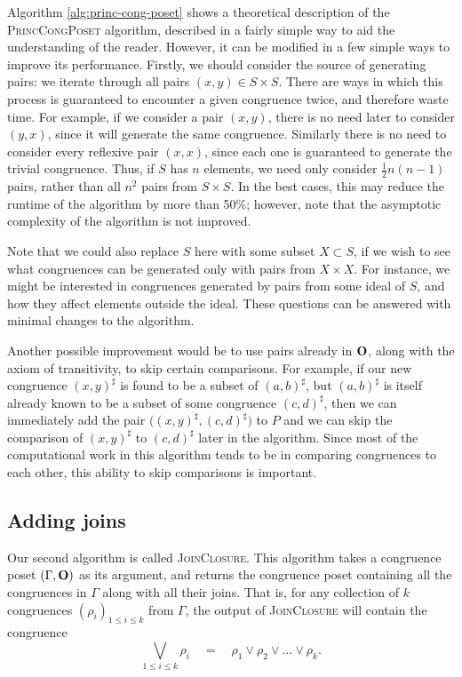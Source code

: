 Algorithm \ref{alg:princ-cong-poset} shows a theoretical description of the
\textsc{PrincCongPoset} algorithm, described in a fairly simple way to aid the
understanding of the reader.  However, it can be modified in a few simple ways
to improve its performance.  Firstly, we should consider the source of
generating pairs: we iterate through all pairs $(x,y) \in S \times S$.  There
are ways in which this process is guaranteed to encounter a given congruence
twice, and therefore waste time.  For example, if we consider a pair $(x,y)$,
there is no need later to consider $(y,x)$, since it will generate the same
congruence.  Similarly there is no need to consider every reflexive pair
$(x,x)$, since each one is guaranteed to generate the trivial congruence.  Thus,
if $S$ has $n$ elements, we need only consider $\frac{1}{2}n(n-1)$ pairs, rather
than all $n^2$ pairs from $S \times S$.  In the best cases, this may reduce the
runtime of the algorithm by more than 50\%; however, note that the asymptotic
complexity of the algorithm is not improved.

Note that we could also replace $S$ here with some subset $X \subset S$, if we
wish to see what congruences can be generated only with pairs from $X \times X$.
For instance, we might be interested in congruences generated by pairs from some
ideal of $S$, and how they affect elements outside the ideal.  These questions
can be answered with minimal changes to the algorithm.

Another possible improvement would be to use pairs already in $\mathbf{O}$, along with
the axiom of transitivity, to skip certain comparisons.  For example, if our new
congruence $(x,y)^\sharp$ is found to be a subset of $(a,b)^\sharp$, but
$(a,b)^\sharp$ is itself already known to be a subset of some congruence
$(c,d)^\sharp$, then we can immediately add the pair
$\big((x,y)^\sharp, (c,d)^\sharp\big)$ to $P$ and we can skip the comparison of
$(x,y)^\sharp$ to $(c,d)^\sharp$ later in the algorithm.  Since most of the
computational work in this algorithm tends to be in comparing congruences to
each other, this ability to skip comparisons is important.

\subsection{Adding joins}
\label{sec:join-closure}

Our second algorithm is called \textsc{JoinClosure}.  This algorithm takes a
congruence poset $(\Gamma, \mathbf{O})$ as its argument, and returns the congruence
poset containing all the congruences in $\Gamma$ along with all their joins.
That is, for any collection of $k$ congruences
$(\rho_i)_{1 \leq i \leq k}$ from $\Gamma$, the output of
\textsc{JoinClosure} will contain the congruence
$$\bigvee_{1 \leq i \leq k} \rho_i
\quad=\quad \rho_1 \vee \rho_2 \vee \ldots \vee \rho_k.$$

